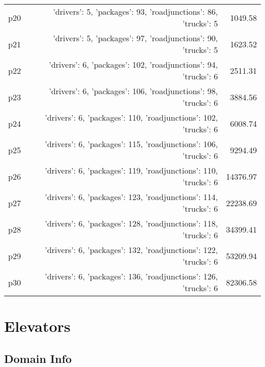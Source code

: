 \documentclass{article}
\begin{document}
\begin{center}
\begin{tabular}{@{}l|r|r@{}}
  p20&{'drivers': 5, 'packages': 93, 'roadjunctions': 86, 'trucks': 5}&1049.58\\
  p21&{'drivers': 5, 'packages': 97, 'roadjunctions': 90, 'trucks': 5}&1623.52\\
  p22&{'drivers': 6, 'packages': 102, 'roadjunctions': 94, 'trucks': 6}&2511.31\\
  p23&{'drivers': 6, 'packages': 106, 'roadjunctions': 98, 'trucks': 6}&3884.56\\
  p24&{'drivers': 6, 'packages': 110, 'roadjunctions': 102, 'trucks': 6}&6008.74\\
  p25&{'drivers': 6, 'packages': 115, 'roadjunctions': 106, 'trucks': 6}&9294.49\\
  p26&{'drivers': 6, 'packages': 119, 'roadjunctions': 110, 'trucks': 6}&14376.97\\
  p27&{'drivers': 6, 'packages': 123, 'roadjunctions': 114, 'trucks': 6}&22238.69\\
  p28&{'drivers': 6, 'packages': 128, 'roadjunctions': 118, 'trucks': 6}&34399.41\\
  p29&{'drivers': 6, 'packages': 132, 'roadjunctions': 122, 'trucks': 6}&53209.94\\
  p30&{'drivers': 6, 'packages': 136, 'roadjunctions': 126, 'trucks': 6}&82306.58
                            \end{tabular}
                            \end{center}
                    
                            \newpage \section{Elevators}
                    \subsection*{Domain Info}
\end{document}
